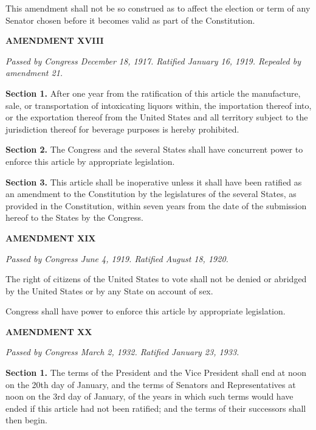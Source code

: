 This amendment shall not be so construed as to affect the election or term of any Senator chosen before it becomes valid as part of the Constitution.

\begin{center} 
\textbf{AMENDMENT XVIII}
\end{center} 

\textit{Passed by Congress December 18, 1917. Ratified January 16, 1919. Repealed by amendment 21.}

\textbf{Section 1.}
After one year from the ratification of this article the manufacture, sale, or transportation of intoxicating liquors within, the importation thereof into, or the exportation thereof from the United States and all territory subject to the jurisdiction thereof for beverage purposes is hereby prohibited.

\textbf{Section 2.}
The Congress and the several States shall have concurrent power to enforce this article by appropriate legislation.

\textbf{Section 3.}
This article shall be inoperative unless it shall have been ratified as an amendment to the Constitution by the legislatures of the several States, as provided in the Constitution, within seven years from the date of the submission hereof to the States by the Congress.

\begin{center} 
\textbf{AMENDMENT XIX}
\end{center} 

\textit{Passed by Congress June 4, 1919. Ratified August 18, 1920.}

The right of citizens of the United States to vote shall not be denied or abridged by the United States or by any State on account of sex.

Congress shall have power to enforce this article by appropriate legislation.

\begin{center} 
\textbf{AMENDMENT XX}
\end{center} 

\textit{Passed by Congress March 2, 1932. Ratified January 23, 1933.}

\textbf{Section 1.}
The terms of the President and the Vice President shall end at noon on the 20th day of January, and the terms of Senators and Representatives at noon on the 3rd day of January, of the years in which such terms would have ended if this article had not been ratified; and the terms of their successors shall then begin.

